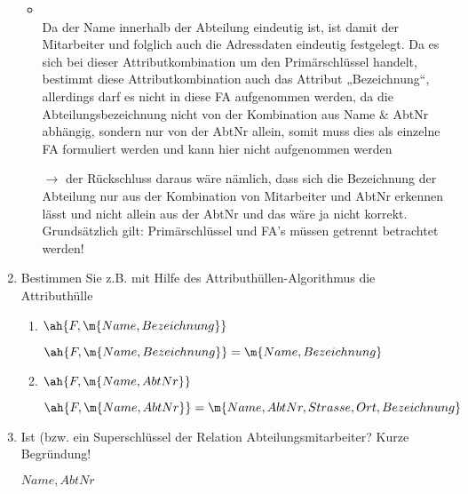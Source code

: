 \documentclass{lehramt-informatik-aufgabe}
\begin{document}
\begin{enumerate}
\begin{liAntwort}
\begin{itemize}
\item {} \\
Da der Name innerhalb der Abteilung eindeutig ist, ist damit der
Mitarbeiter und folglich auch die Adressdaten eindeutig festgelegt. Da
es sich bei dieser Attributkombination um den Primärschlüssel handelt,
bestimmt diese Attributkombination auch das Attribut „Bezeichnung“,
allerdings darf es nicht in diese FA aufgenommen werden, da die
Abteilungsbezeichnung nicht von der Kombination aus Name \& AbtNr
abhängig, sondern nur von der AbtNr allein, somit muss dies als
einzelne FA formuliert werden und kann hier nicht aufgenommen werden

$\rightarrow$ der Rückschluss daraus wäre nämlich, dass sich die
Bezeichnung der Abteilung nur aus der Kombination von Mitarbeiter und
AbtNr erkennen lässt und nicht allein aus der AbtNr und das wäre ja
nicht korrekt. Grundsätzlich gilt: Primärschlüssel und FA’s müssen
getrennt betrachtet werden!

\end{itemize}

\end{liAntwort}


\item Bestimmen Sie z.B. mit Hilfe des Attributhüllen-Algorithmus die
Attributhülle

\begin{enumerate}


\item $\ah{F, \m{Name, Bezeichnung}}$

\begin{liAntwort}
$\ah{F, \m{Name, Bezeichnung}} = \m{Name, Bezeichnung}$
\end{liAntwort}


\item $\ah{F, \m{Name, AbtNr}}$

\begin{liAntwort}
$\ah{F, \m{Name, AbtNr}} = \m{Name, AbtNr, Strasse, Ort, Bezeichnung}$
\end{liAntwort}
\end{enumerate}


\item Ist  (bzw.  ein Superschlüssel
der Relation Abteilungsmitarbeiter? Kurze Begründung!

\begin{liAntwort}
${Name, AbtNr}$
\end{liAntwort}

\end{enumerate}
\end{document}
